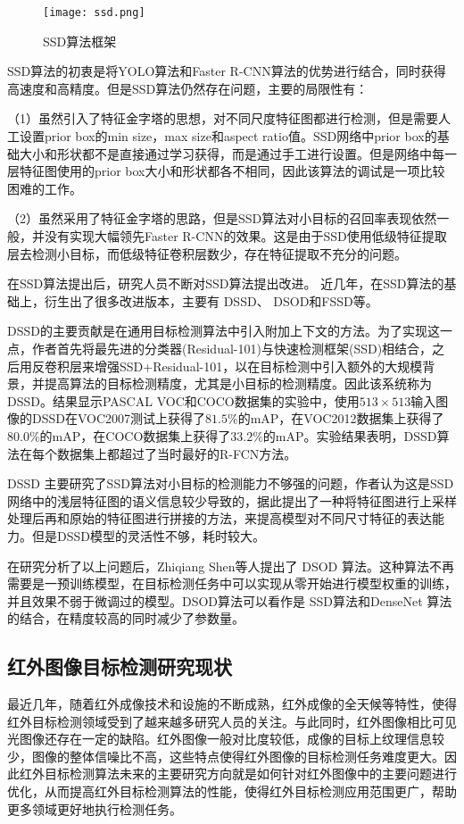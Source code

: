\begin{figure}[htbp]
    \centering
    \texttt{[image: ssd.png]}
    \caption{SSD算法框架}
    \label{ssd}
\end{figure}

SSD算法的初衷是将YOLO算法和Faster R-CNN算法的优势进行结合，同时获得高速度和高精度。但是SSD算法仍然存在问题，主要的局限性有：

（1）虽然引入了特征金字塔的思想，对不同尺度特征图都进行检测，但是需要人工设置prior box的min size，max size和aspect ratio值。SSD网络中prior box的基础大小和形状都不是直接通过学习获得，而是通过手工进行设置。但是网络中每一层特征图使用的prior box大小和形状都各不相同，因此该算法的调试是一项比较困难的工作。

（2）虽然采用了特征金字塔的思路，但是SSD算法对小目标的召回率表现依然一般，并没有实现大幅领先Faster R-CNN的效果。这是由于SSD使用低级特征提取层去检测小目标，而低级特征卷积层数少，存在特征提取不充分的问题。

在SSD算法提出后，研究人员不断对SSD算法提出改进。
近几年，在SSD算法的基础上，衍生出了很多改进版本，主要有 DSSD\cite{fu2017dssd}、
DSOD\cite{shen2017dsod}和FSSD\cite{li2017fssd}等。

DSSD的主要贡献是在通用目标检测算法中引入附加上下文的方法。为了实现这一点，作者首先将最先进的分类器(Residual-101)与快速检测框架(SSD)相结合，之后用反卷积层来增强SSD+Residual-101，以在目标检测中引入额外的大规模背景，并提高算法的目标检测精度，尤其是小目标的检测精度。因此该系统称为DSSD。结果显示PASCAL VOC和COCO数据集的实验中，使用$513 \times513$输入图像的DSSD在VOC2007测试上获得了$81.5\%$的mAP，在VOC2012数据集上获得了$80.0\%$的mAP，在COCO数据集上获得了$33.2\%$的mAP。实验结果表明，DSSD算法在每个数据集上都超过了当时最好的R-FCN方法。

DSSD 主要研究了SSD算法对小目标的检测能力不够强的问题，作者认为这是SSD网络中的浅层特征图的语义信息较少导致的，据此提出了一种将特征图进行上采样处理后再和原始的特征图进行拼接的方法，来提高模型对不同尺寸特征的表达能力。但是DSSD模型的灵活性不够，耗时较大。

在研究分析了以上问题后，Zhiqiang Shen等人提出了 DSOD 算法。这种算法不再需要是一预训练模型，在目标检测任务中可以实现从零开始进行模型权重的训练，并且效果不弱于微调过的模型。DSOD算法可以看作是 SSD算法和DenseNet 算法的结合，在精度较高的同时减少了参数量。

\subsection{红外图像目标检测研究现状}
最近几年，随着红外成像技术和设施的不断成熟，红外成像的全天候等特性，使得红外目标检测领域受到了越来越多研究人员的关注。与此同时，红外图像相比可见光图像还存在一定的缺陷。红外图像一般对比度较低，成像的目标上纹理信息较少，图像的整体信噪比不高，这些特点使得红外图像的目标检测任务难度更大。因此红外目标检测算法未来的主要研究方向就是如何针对红外图像中的主要问题进行优化，从而提高红外目标检测算法的性能，使得红外目标检测应用范围更广，帮助更多领域更好地执行检测任务。

